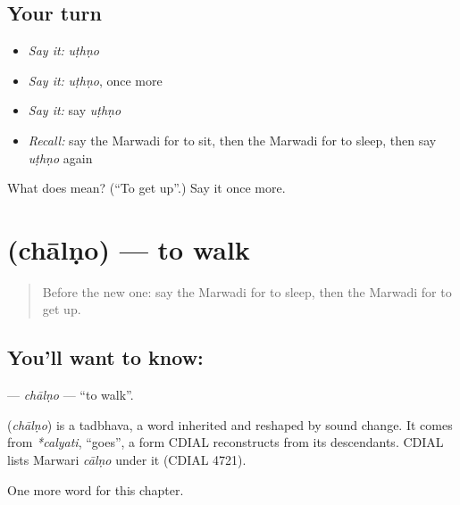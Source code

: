 \subsection*{Your turn}
\begin{itemize}
\raggedright
  \item \emph{Say it:} \emph{uṭhṇo}
  \item \emph{Say it:} \emph{uṭhṇo}, once more
  \item \emph{Say it:} say \emph{uṭhṇo}
  \item \emph{Recall:} say the Marwadi for to sit, then the Marwadi for to sleep, then say \emph{uṭhṇo} again
\end{itemize}

\begin{tcolorbox}[breakable,colback=teal!4,colframe=teal!35!black,title={Before you move on}]
What does  mean? (\textquotedblleft{}To get up\textquotedblright{}.) Say it once more.
\end{tcolorbox}
\section[\texorpdfstring{\mw{चालणो} (chālṇo)}{चालणो (chālṇo)}]{ (chālṇo) — to walk}

\label{lesson:MW-C52-chalno}



\begin{quote}
Before the new one: say the Marwadi for to sleep, then the Marwadi for to get up.
\end{quote}

\subsection*{You'll want to know: }
\textbf{} — \emph{chālṇo} — \textquotedblleft{}to walk\textquotedblright{}.

\begin{cousinweb}
\textbf{} (\emph{chālṇo}) is a tadbhava, a word inherited and reshaped by sound change. It comes from \emph{*calyati}, \textquotedblleft{}goes\textquotedblright{}, a form CDIAL reconstructs from its descendants. CDIAL lists Marwari \emph{cālṇo} under it (CDIAL 4721).
\end{cousinweb}

\begin{grammarlens}[title={What you've built}]
One more word for this chapter.
\end{grammarlens}

